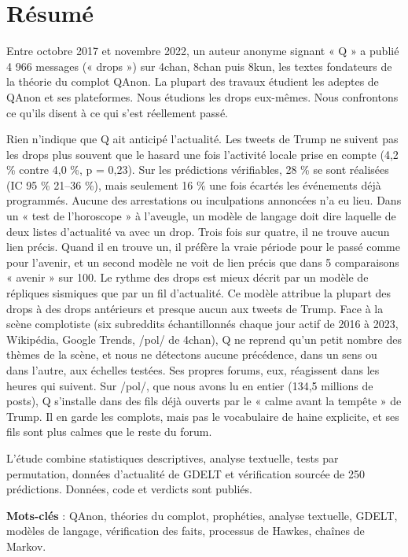 \documentclass[11pt,a4paper]{article}
\begin{document}
\section*{Résumé}

Entre octobre 2017 et novembre 2022, un auteur anonyme signant « Q » a publié 4 966 messages (« drops ») sur 4chan, 8chan puis 8kun, les textes fondateurs de la théorie du complot QAnon. La plupart des travaux étudient les adeptes de QAnon et ses plateformes. Nous étudions les drops eux-mêmes. Nous confrontons ce qu'ils disent à ce qui s'est réellement passé.

Rien n'indique que Q ait anticipé l'actualité. Les tweets de Trump ne suivent pas les drops plus souvent que le hasard une fois l'activité locale prise en compte (4,2 \% contre 4,0 \%, p = 0,23). Sur les prédictions vérifiables, 28 \% se sont réalisées (IC 95 \% 21–36 \%), mais seulement 16 \% une fois écartés les événements déjà programmés. Aucune des arrestations ou inculpations annoncées n'a eu lieu. Dans un « test de l'horoscope » à l'aveugle, un modèle de langage doit dire laquelle de deux listes d'actualité va avec un drop. Trois fois sur quatre, il ne trouve aucun lien précis. Quand il en trouve un, il préfère la vraie période pour le passé comme pour l'avenir, et un second modèle ne voit de lien précis que dans 5 comparaisons « avenir » sur 100. Le rythme des drops est mieux décrit par un modèle de répliques sismiques que par un fil d'actualité. Ce modèle attribue la plupart des drops à des drops antérieurs et presque aucun aux tweets de Trump. Face à la scène complotiste (six subreddits échantillonnés chaque jour actif de 2016 à 2023, Wikipédia, Google Trends, /pol/ de 4chan), Q ne reprend qu'un petit nombre des thèmes de la scène, et nous ne détectons aucune précédence, dans un sens ou dans l'autre, aux échelles testées. Ses propres forums, eux, réagissent dans les heures qui suivent. Sur /pol/, que nous avons lu en entier (134,5 millions de posts), Q s'installe dans des fils déjà ouverts par le « calme avant la tempête » de Trump. Il en garde les complots, mais pas le vocabulaire de haine explicite, et ses fils sont plus calmes que le reste du forum.

L'étude combine statistiques descriptives, analyse textuelle, tests par permutation, données d'actualité de GDELT et vérification sourcée de 250 prédictions. Données, code et verdicts sont publiés.

\textbf{Mots-clés} : QAnon, théories du complot, prophéties, analyse textuelle, GDELT, modèles de langage, vérification des faits, processus de Hawkes, chaînes de Markov.
\end{document}
